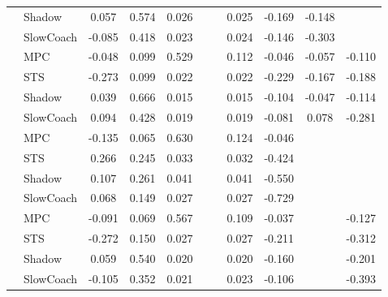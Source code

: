 \begin{tabular}{|l|l|*{9}{c|}}
                                                           & Shadow &    0.057 &     0.574 &     0.026 &     &     &  0.025 &  -0.169 &  -0.148 &       \\
                                                           & SlowCoach &   -0.085 &     0.418 &     0.023 &     &     &  0.024 &  -0.146 &  -0.303 &       \\
\midrule
[True, True, True, False, False, True, True, True, True] & MPC &   -0.048 &     0.099 &     0.529 &     &     &  0.112 &  -0.046 &  -0.057 &   -0.110 \\
                                                           & STS &   -0.273 &     0.099 &     0.022 &     &     &  0.022 &  -0.229 &  -0.167 &   -0.188 \\
                                                           & Shadow &    0.039 &     0.666 &     0.015 &     &     &  0.015 &  -0.104 &  -0.047 &   -0.114 \\
                                                           & SlowCoach &    0.094 &     0.428 &     0.019 &     &     &  0.019 &  -0.081 &   0.078 &   -0.281 \\
\midrule
[True, True, True, False, False, True, True, False, False] & MPC &   -0.135 &     0.065 &     0.630 &     &     &  0.124 &  -0.046 &      &       \\
                                                           & STS &    0.266 &     0.245 &     0.033 &     &     &  0.032 &  -0.424 &      &       \\
                                                           & Shadow &    0.107 &     0.261 &     0.041 &     &     &  0.041 &  -0.550 &      &       \\
                                                           & SlowCoach &    0.068 &     0.149 &     0.027 &     &     &  0.027 &  -0.729 &      &       \\
\midrule
[True, True, True, False, False, True, True, False, True] & MPC &   -0.091 &     0.069 &     0.567 &     &     &  0.109 &  -0.037 &      &   -0.127 \\
                                                           & STS &   -0.272 &     0.150 &     0.027 &     &     &  0.027 &  -0.211 &      &   -0.312 \\
                                                           & Shadow &    0.059 &     0.540 &     0.020 &     &     &  0.020 &  -0.160 &      &   -0.201 \\
                                                           & SlowCoach &   -0.105 &     0.352 &     0.021 &     &     &  0.023 &  -0.106 &      &   -0.393 \\

\end{tabular}
